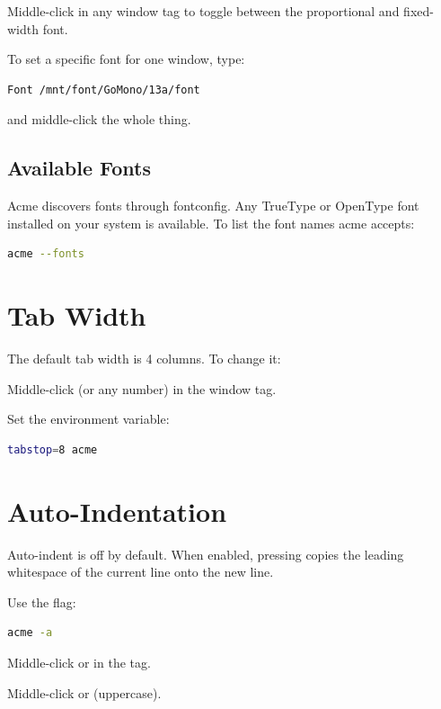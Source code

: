 Middle-click  in any window tag to toggle between the
proportional and fixed-width font.

To set a specific font for one window, type:

\begin{Verbatim}[frame=single]
Font /mnt/font/GoMono/13a/font
\end{Verbatim}

\noindent
and middle-click the whole thing.

\subsection{Available Fonts}

Acme discovers fonts through fontconfig.  Any TrueType or OpenType font
installed on your system is available.  To list the font names acme
accepts:

\begin{lstlisting}[language=bash]
acme --fonts
\end{lstlisting}

\section{Tab Width}
\label{sec:tabwidth}


The default tab width is 4 columns.  To change it:

\begin{description}[style=nextline]
\item[Per window:]
Middle-click  (or any number) in the window tag.

\item[At startup:]
Set the  environment variable:
\begin{lstlisting}[language=bash]
tabstop=8 acme
\end{lstlisting}
\end{description}

\section{Auto-Indentation}
\label{sec:autoindent}


Auto-indent is off by default.  When enabled, pressing 
copies the leading whitespace of the current line onto the new line.

\begin{description}[style=nextline]
\item[At startup:]
Use the  flag:
\begin{lstlisting}[language=bash]
acme -a
\end{lstlisting}

\item[Per window:]
Middle-click  or  in the tag.

\item[Globally:]
Middle-click  or  (uppercase).
\end{description}

